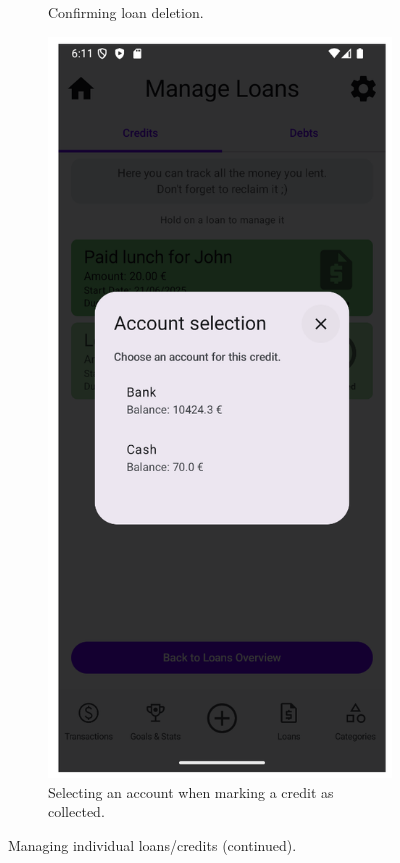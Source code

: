 \documentclass[a4paper,12pt]{article}
\begin{document}
\begin{figure}[H]
\begin{subfigure}[b]{0.23\textwidth}
        \caption{Confirming loan deletion.}
        \label{fig:loan_delete_confirm}
    \end{subfigure}
    \hfill
    \begin{subfigure}[b]{0.23\textwidth}
        \includegraphics[width=\textwidth]{manage_loans_complete_dialog.png}
        \caption{Selecting an account when marking a credit as collected.}
        \label{fig:loan_mark_collected_account}
    \end{subfigure}
    \caption{Managing individual loans/credits (continued).}
    \label{fig:loan_management_2}
\end{figure}
\end{document}
